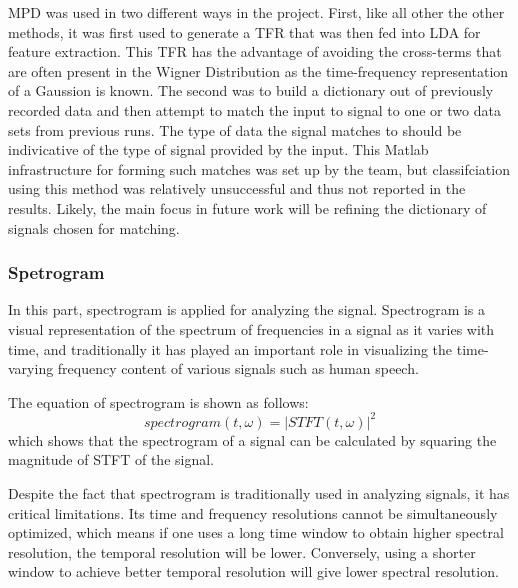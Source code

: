 \documentclass{article}[11pt]
\begin{document}
MPD was used in two different ways in the project.  First, like all other the other methods, it was first used to generate a TFR that was then fed into LDA for feature extraction.  This TFR has the advantage of avoiding the cross-terms that are often present in the Wigner Distribution as the time-frequency representation of a Gaussion is known.  The second was to build a dictionary out of previously recorded data and then attempt to match the input to signal to one or two data sets from previous runs.  The type of data the signal matches to should be indivicative of the type of signal provided by the input.  This Matlab infrastructure for forming such matches was set up by the team, but classifciation using this method was relatively unsuccessful and thus not reported in the results.  Likely, the main focus in future work will be refining the dictionary of signals chosen for matching.

\subsubsection{Spetrogram}
\label{sec:spect}
In this part, spectrogram is applied for analyzing the signal. Spectrogram is a visual representation of the spectrum of frequencies in a signal as it varies with time,  and traditionally it has played an important role in visualizing the time-varying frequency content of various signals such as human speech.

The equation of spectrogram is shown as follows: 
\begin{equation}
\label{eq:Spectrogram}
spectrogram(t,\omega)=|STFT(t,\omega)|^2
\end{equation}
which shows that the spectrogram of a signal can be calculated by squaring the magnitude of STFT of the signal. 

Despite the fact that spectrogram is traditionally used in analyzing signals, it has critical limitations. Its time and frequency resolutions cannot be simultaneously optimized, which means if one uses a long time window to obtain higher spectral resolution, the temporal resolution will be lower. Conversely, using a shorter window to achieve better temporal resolution will give lower spectral resolution.
\end{document}
